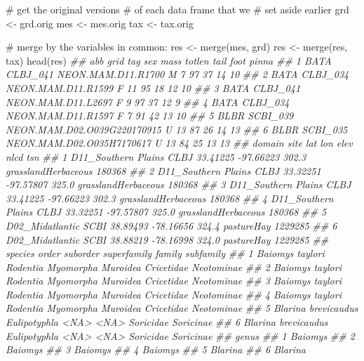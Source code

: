 \documentclass[
  13,
  letterpaper,
]{report}
\newenvironment{Shaded}{\begin{snugshade}}{\end{snugshade}}
\newcommand{\CommentTok}[1]{\textcolor[rgb]{0.37,0.37,0.37}{#1}}
\newcommand{\DocumentationTok}[1]{\textcolor[rgb]{0.37,0.37,0.37}{\textit{#1}}}
\newcommand{\FunctionTok}[1]{\textcolor[rgb]{0.28,0.35,0.67}{#1}}
\newcommand{\NormalTok}[1]{\textcolor[rgb]{0.00,0.23,0.31}{#1}}
\newcommand{\OtherTok}[1]{\textcolor[rgb]{0.00,0.23,0.31}{#1}}
\begin{document}
\begin{Shaded}
\begin{Highlighting}[]
\CommentTok{\# get the original versions}
\CommentTok{\# of each data frame that we}
\CommentTok{\# set aside earlier}
\NormalTok{grd }\OtherTok{\textless{}{-}}\NormalTok{ grd.orig}
\NormalTok{mes }\OtherTok{\textless{}{-}}\NormalTok{ mes.orig}
\NormalTok{tax }\OtherTok{\textless{}{-}}\NormalTok{ tax.orig}

\CommentTok{\# merge by the variables in common:}
\NormalTok{res }\OtherTok{\textless{}{-}} \FunctionTok{merge}\NormalTok{(mes, grd)}
\NormalTok{res }\OtherTok{\textless{}{-}} \FunctionTok{merge}\NormalTok{(res, tax)}
\FunctionTok{head}\NormalTok{(res)}
\DocumentationTok{\#\#    abb     grid                         tag sex mass totlen tail foot pinna}
\DocumentationTok{\#\# 1 BATA CLBJ\_041          NEON.MAM.D11.R1700   M    7     97   37   14    10}
\DocumentationTok{\#\# 2 BATA CLBJ\_034          NEON.MAM.D11.R1599   F   11     95   18   12    10}
\DocumentationTok{\#\# 3 BATA CLBJ\_041          NEON.MAM.D11.L2697   F    9     97   37   12     9}
\DocumentationTok{\#\# 4 BATA CLBJ\_034          NEON.MAM.D11.R1597   F    7     91   42   13    10}
\DocumentationTok{\#\# 5 BLBR SCBI\_039 NEON.MAM.D02.O039G220170915   U   13     87   26   14    13}
\DocumentationTok{\#\# 6 BLBR SCBI\_035   NEON.MAM.D02.O035H7170617   U   13     84   25   13    13}
\DocumentationTok{\#\#                domain site      lat       lon  elev                nlcd     tsn}
\DocumentationTok{\#\# 1 D11\_Southern Plains CLBJ 33.41225 {-}97.66223 302.3 grasslandHerbaceous  180368}
\DocumentationTok{\#\# 2 D11\_Southern Plains CLBJ 33.32251 {-}97.57807 325.0 grasslandHerbaceous  180368}
\DocumentationTok{\#\# 3 D11\_Southern Plains CLBJ 33.41225 {-}97.66223 302.3 grasslandHerbaceous  180368}
\DocumentationTok{\#\# 4 D11\_Southern Plains CLBJ 33.32251 {-}97.57807 325.0 grasslandHerbaceous  180368}
\DocumentationTok{\#\# 5     D02\_Midatlantic SCBI 38.89493 {-}78.16656 324.4          pastureHay 1229285}
\DocumentationTok{\#\# 6     D02\_Midatlantic SCBI 38.88219 {-}78.16998 324.0          pastureHay 1229285}
\DocumentationTok{\#\#               species        order  suborder superfamily     family  subfamily}
\DocumentationTok{\#\# 1     Baiomys taylori     Rodentia Myomorpha    Muroidea Cricetidae Neotominae}
\DocumentationTok{\#\# 2     Baiomys taylori     Rodentia Myomorpha    Muroidea Cricetidae Neotominae}
\DocumentationTok{\#\# 3     Baiomys taylori     Rodentia Myomorpha    Muroidea Cricetidae Neotominae}
\DocumentationTok{\#\# 4     Baiomys taylori     Rodentia Myomorpha    Muroidea Cricetidae Neotominae}
\DocumentationTok{\#\# 5 Blarina brevicaudus Eulipotyphla      \textless{}NA\textgreater{}        \textless{}NA\textgreater{}  Soricidae  Soricinae}
\DocumentationTok{\#\# 6 Blarina brevicaudus Eulipotyphla      \textless{}NA\textgreater{}        \textless{}NA\textgreater{}  Soricidae  Soricinae}
\DocumentationTok{\#\#     genus}
\DocumentationTok{\#\# 1 Baiomys}
\DocumentationTok{\#\# 2 Baiomys}
\DocumentationTok{\#\# 3 Baiomys}
\DocumentationTok{\#\# 4 Baiomys}
\DocumentationTok{\#\# 5 Blarina}
\DocumentationTok{\#\# 6 Blarina}


\end{Highlighting}
\end{Shaded}
\end{document}

